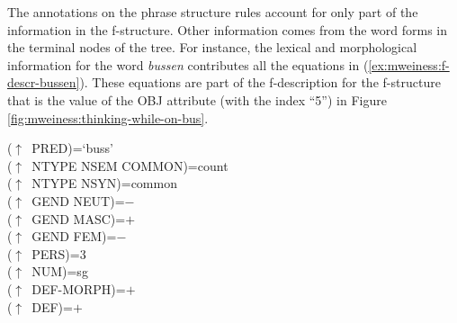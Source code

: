 \documentclass[output=paper]{langsci/langscibook}
\begin{document}
The annotations on the phrase structure rules account for only part of the information in the f-structure.
Other information comes from the word forms in the terminal nodes of the tree.
For instance, the lexical and morphological information for the word \textit{bussen} contributes all the equations in (\ref{ex:mweiness:f-descr-bussen}).
These equations are part of the f-description for the f-structure that is the value of the OBJ attribute (with the index ``5'') in Figure \ref{fig:mweiness:thinking-while-on-bus}.




\ea\label{ex:mweiness:f-descr-bussen}
{\small 
($\uparrow$~PRED)=`buss' \\
($\uparrow$~NTYPE NSEM COMMON)=count \\
($\uparrow$~NTYPE NSYN)=common \\
($\uparrow$~GEND NEUT)=$-$ \\
($\uparrow$~GEND MASC)=$+$ \\
($\uparrow$~GEND FEM)=$-$ \\
($\uparrow$~PERS)=3 \\
($\uparrow$~NUM)=sg \\
($\uparrow$~DEF-MORPH)=$+$ \\
($\uparrow$~DEF)=$+$ \\
}
\z
\end{document}
